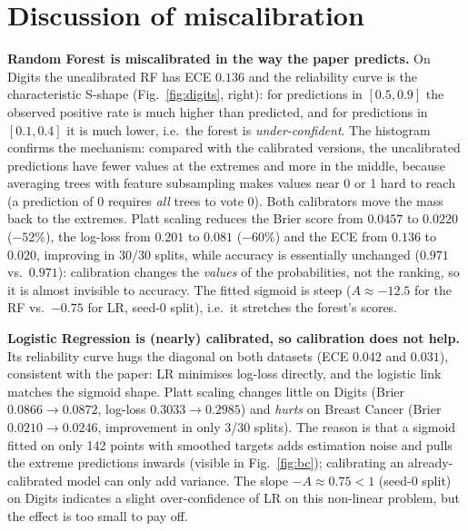 \documentclass[11pt,a4paper]{article}
\begin{document}
\section{Discussion of miscalibration}\label{sec:discussion}
\textbf{Random Forest is miscalibrated in the way the paper predicts.} On Digits the uncalibrated RF has ECE $0.136$ and the reliability curve is the characteristic S-shape (Fig.~\ref{fig:digits}, right): for predictions in $[0.5,0.9]$ the observed positive rate is much higher than predicted, and for predictions in $[0.1,0.4]$ it is much lower, i.e.\ the forest is \emph{under-confident}. The histogram confirms the mechanism: compared with the calibrated versions, the uncalibrated predictions have fewer values at the extremes and more in the middle, because averaging trees with feature subsampling makes values near 0 or 1 hard to reach (a prediction of 0 requires \emph{all} trees to vote 0). Both calibrators move the mass back to the extremes. Platt scaling reduces the Brier score from $0.0457$ to $0.0220$ ($-52\%$), the log-loss from $0.201$ to $0.081$ ($-60\%$) and the ECE from $0.136$ to $0.020$, improving in 30/30 splits, while accuracy is essentially unchanged ($0.971$ vs.\ $0.971$): calibration changes the \emph{values} of the probabilities, not the ranking, so it is almost invisible to accuracy. The fitted sigmoid is steep ($A\approx-12.5$ for the RF vs.\ $-0.75$ for LR, seed-0 split), i.e.\ it stretches the forest's scores.

\textbf{Logistic Regression is (nearly) calibrated, so calibration does not help.} Its reliability curve hugs the diagonal on both datasets (ECE $0.042$ and $0.031$), consistent with the paper: LR minimises log-loss directly, and the logistic link matches the sigmoid shape. Platt scaling changes little on Digits (Brier $0.0866\to0.0872$, log-loss $0.3033\to0.2985$) and \emph{hurts} on Breast Cancer (Brier $0.0210\to0.0246$, improvement in only 3/30 splits). The reason is that a sigmoid fitted on only 142 points with smoothed targets adds estimation noise and pulls the extreme predictions inwards (visible in Fig.~\ref{fig:bc}); calibrating an already-calibrated model can only add variance. The slope $-A\approx0.75<1$ (seed-0 split) on Digits indicates a slight over-confidence of LR on this non-linear problem, but the effect is too small to pay off.
\end{document}
